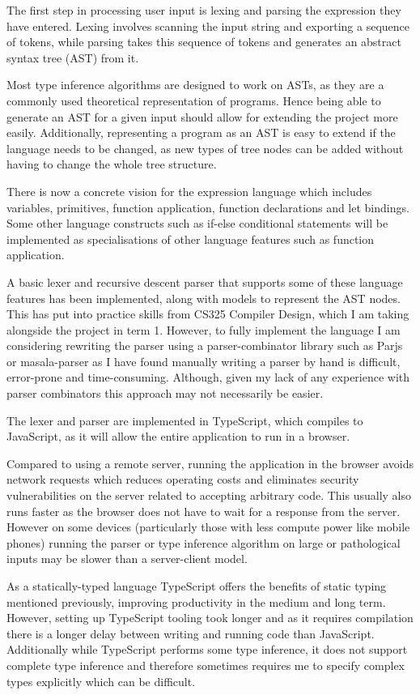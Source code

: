 \documentclass[a4paper,fleqn,12pt]{article}
\begin{document}
The first step in processing user input is lexing and parsing the expression they have entered. Lexing involves scanning the input string and exporting a sequence of tokens, while parsing takes this sequence of tokens and generates an abstract syntax tree (AST) from it.

Most type inference algorithms are designed to work on ASTs, as they are a commonly used theoretical representation of programs. Hence being able to generate an AST for a given input should allow for extending the project more easily. Additionally, representing a program as an AST is easy to extend if the language needs to be changed, as new types of tree nodes can be added without having to change the whole tree structure.

There is now a concrete vision for the expression language which includes variables, primitives, function application, function declarations and let bindings. Some other language constructs such as if-else conditional statements will be implemented as specialisations of other language features such as function application.

A basic lexer and recursive descent parser that supports some of these language features has been implemented, along with models to represent the AST nodes. This has put into practice skills from CS325 Compiler Design, which I am taking alongside the project in term 1. However, to fully implement the language I am considering rewriting the parser using a parser-combinator library such as Parjs \citep{ref11} or masala-parser \citep{ref12} as I have found manually writing a parser by hand is difficult, error-prone and time-consuming. Although, given my lack of any experience with parser combinators this approach may not necessarily be easier.

The lexer and parser are implemented in TypeScript, which compiles to JavaScript, as it will allow the entire application to run in a browser.

Compared to using a remote server, running the application in the browser avoids network requests which reduces operating costs and eliminates security vulnerabilities on the server related to accepting arbitrary code. This usually also runs faster as the browser does not have to wait for a response from the server. However on some devices (particularly those with less compute power like mobile phones) running the parser or type inference algorithm on large or pathological inputs may be slower than a server-client model.

As a statically-typed language TypeScript offers the benefits of static typing mentioned previously, improving productivity in the medium and long term. However, setting up TypeScript tooling took longer and as it requires compilation there is a longer delay between writing and running code than JavaScript. Additionally while TypeScript performs some type inference, it does not support complete type inference and therefore sometimes requires me to specify complex types explicitly which can be difficult.
\end{document}
